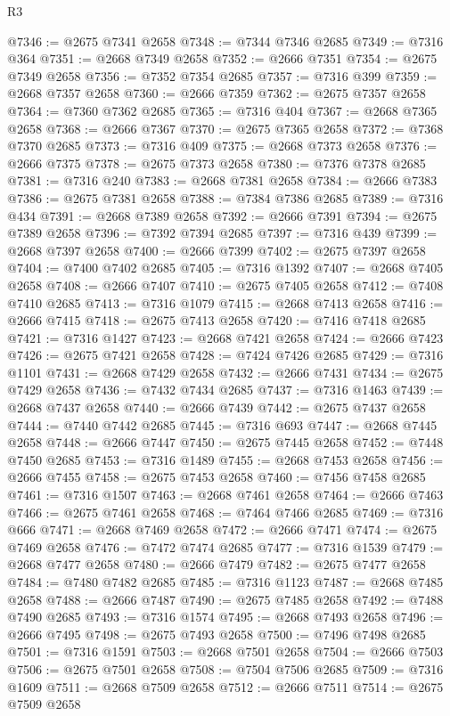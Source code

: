\begin{lexlean}{R3}
\begin{coremodule}
@7346 := @2675 @7341 @2658
@7348 := @7344 @7346 @2685
@7349 := @7316 @364
@7351 := @2668 @7349 @2658
@7352 := @2666 @7351
@7354 := @2675 @7349 @2658
@7356 := @7352 @7354 @2685
@7357 := @7316 @399
@7359 := @2668 @7357 @2658
@7360 := @2666 @7359
@7362 := @2675 @7357 @2658
@7364 := @7360 @7362 @2685
@7365 := @7316 @404
@7367 := @2668 @7365 @2658
@7368 := @2666 @7367
@7370 := @2675 @7365 @2658
@7372 := @7368 @7370 @2685
@7373 := @7316 @409
@7375 := @2668 @7373 @2658
@7376 := @2666 @7375
@7378 := @2675 @7373 @2658
@7380 := @7376 @7378 @2685
@7381 := @7316 @240
@7383 := @2668 @7381 @2658
@7384 := @2666 @7383
@7386 := @2675 @7381 @2658
@7388 := @7384 @7386 @2685
@7389 := @7316 @434
@7391 := @2668 @7389 @2658
@7392 := @2666 @7391
@7394 := @2675 @7389 @2658
@7396 := @7392 @7394 @2685
@7397 := @7316 @439
@7399 := @2668 @7397 @2658
@7400 := @2666 @7399
@7402 := @2675 @7397 @2658
@7404 := @7400 @7402 @2685
@7405 := @7316 @1392
@7407 := @2668 @7405 @2658
@7408 := @2666 @7407
@7410 := @2675 @7405 @2658
@7412 := @7408 @7410 @2685
@7413 := @7316 @1079
@7415 := @2668 @7413 @2658
@7416 := @2666 @7415
@7418 := @2675 @7413 @2658
@7420 := @7416 @7418 @2685
@7421 := @7316 @1427
@7423 := @2668 @7421 @2658
@7424 := @2666 @7423
@7426 := @2675 @7421 @2658
@7428 := @7424 @7426 @2685
@7429 := @7316 @1101
@7431 := @2668 @7429 @2658
@7432 := @2666 @7431
@7434 := @2675 @7429 @2658
@7436 := @7432 @7434 @2685
@7437 := @7316 @1463
@7439 := @2668 @7437 @2658
@7440 := @2666 @7439
@7442 := @2675 @7437 @2658
@7444 := @7440 @7442 @2685
@7445 := @7316 @693
@7447 := @2668 @7445 @2658
@7448 := @2666 @7447
@7450 := @2675 @7445 @2658
@7452 := @7448 @7450 @2685
@7453 := @7316 @1489
@7455 := @2668 @7453 @2658
@7456 := @2666 @7455
@7458 := @2675 @7453 @2658
@7460 := @7456 @7458 @2685
@7461 := @7316 @1507
@7463 := @2668 @7461 @2658
@7464 := @2666 @7463
@7466 := @2675 @7461 @2658
@7468 := @7464 @7466 @2685
@7469 := @7316 @666
@7471 := @2668 @7469 @2658
@7472 := @2666 @7471
@7474 := @2675 @7469 @2658
@7476 := @7472 @7474 @2685
@7477 := @7316 @1539
@7479 := @2668 @7477 @2658
@7480 := @2666 @7479
@7482 := @2675 @7477 @2658
@7484 := @7480 @7482 @2685
@7485 := @7316 @1123
@7487 := @2668 @7485 @2658
@7488 := @2666 @7487
@7490 := @2675 @7485 @2658
@7492 := @7488 @7490 @2685
@7493 := @7316 @1574
@7495 := @2668 @7493 @2658
@7496 := @2666 @7495
@7498 := @2675 @7493 @2658
@7500 := @7496 @7498 @2685
@7501 := @7316 @1591
@7503 := @2668 @7501 @2658
@7504 := @2666 @7503
@7506 := @2675 @7501 @2658
@7508 := @7504 @7506 @2685
@7509 := @7316 @1609
@7511 := @2668 @7509 @2658
@7512 := @2666 @7511
@7514 := @2675 @7509 @2658

\end{coremodule}
\end{lexlean}
